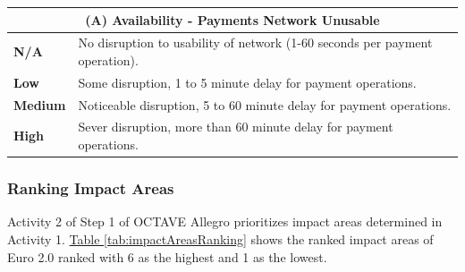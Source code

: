 \documentclass[12pt]{article} %
\newcommand{\hypertableref}[1]{\hyperref[#1]{Table \ref{#1}}}
\begin{document}
{\begin{center}
\begin{tabular}{ | l | p{12cm} | }
  \hline
  \multicolumn{2}{|c|}{\textbf{(A) Availability - Payments Network Unusable}}
  \\ \hline
  \textbf{N/A} & No disruption to usability of network (1-60 seconds per payment operation).
  \\ \hline
  \textbf{Low} & Some disruption, 1 to 5 minute delay for payment operations.
  \\ \hline
  \textbf{Medium} & Noticeable disruption, 5 to 60 minute delay for payment operations.
  \\ \hline
  \textbf{High} & Sever disruption, more than 60 minute delay for payment operations.
  \\ \hline
\end{tabular}
\end{center}
\label{tab:availabilityRiskCriteria}


\subsubsection{Ranking Impact Areas} \label{sssec:5.1:ranking}

Activity 2 of Step 1 of OCTAVE Allegro prioritizes impact areas determined in Activity 1. \hypertableref{tab:impactAreasRanking} shows the ranked impact areas of Euro 2.0 ranked with 6 as the highest and 1 as the lowest.

\begin{center}
\end{center}
\label{tab:impactAreasRanking}

}
\end{document}
